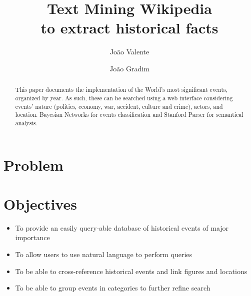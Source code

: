 \documentclass{llncs}
\begin{document}
\mainmatter              %
%
\title{Text Mining Wikipedia\\to extract historical facts}
%
%
\author{João Valente \and João Gradim}
%
%
%

\maketitle              %

\begin{abstract}
This paper documents the implementation of the World's most significant events, organized by year. As such, these can be searched using a web interface considering events' nature (politics, economy, war, accident, culture and crime), actors, and location. Bayesian Networks for events classification and Stanford Parser for semantical analysis.
\end{abstract}

\section{Problem}


\section{Objectives}

\begin{itemize}
	\item To provide an easily query-able database of historical events of major importance
	\item To allow users to use natural language to perform queries
	\item To be able to cross-reference historical events and link figures and locations
	\item To be able to group events in categories to further refine search
\end{itemize}
\end{document}
